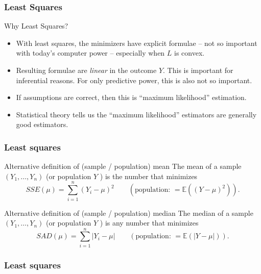 \documentclass[handout]{beamer}
\newcommand{\Ee}{\mathbb{E}}
\begin{document}

   \begin{frame} \frametitle{Least Squares}

   \begin{block}
   {Why Least Squares?}
   \begin{itemize}[<+->]
   \item With least squares, the minimizers have explicit formulae -- not so important with today's computer power -- especially when $L$ is convex.
   \item Resulting formulae are {\em linear} in the outcome $Y$. This is important
   for inferential reasons. For only predictive power, this is also not so important.
   \item If assumptions are correct, then this is ``maximum likelihood'' estimation.

   \item Statistical theory tells us the ``maximum likelihood'' estimators are generally good estimators.
   \end{itemize}
   \end{block}
   \end{frame}


   \begin{frame} \frametitle{Least squares}

   \begin{block}
   {Alternative definition of (sample / population) mean}
   The mean of a sample $(Y_1, \dots, Y_n)$ (or population $Y$ ) is the number that minimizes
   $$
   SSE(\mu) = \sum_{i=1}^n (Y_i - \mu)^2 \qquad \left(\text{population: \ } = \Ee((Y-\mu)^2) \right).$$
   \end{block}
   \begin{block}
   {Alternative definition of (sample / population) median}
   The median of a sample $(Y_1, \dots, Y_n)$ (or population $Y$ ) is any number that minimizes
   $$
   SAD(\mu) = \sum_{i=1}^n |Y_i - \mu| \qquad \left(\text{population: \ } = \Ee(|Y-\mu|) \right).$$
   \end{block}
   \end{frame}



   \begin{frame}
   \frametitle{Least squares}
   \begin{center}
   \end{center}

   \end{frame}
\end{document}

